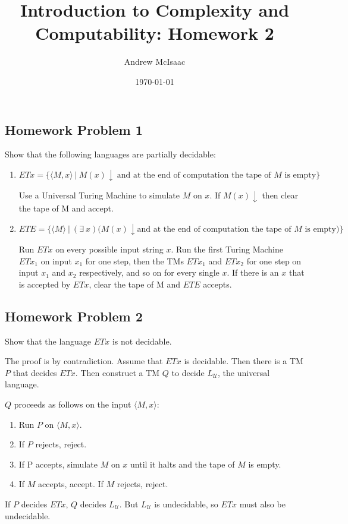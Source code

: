 \documentclass{article}
\author{Andrew McIsaac}
\title{Introduction to Complexity and Computability: Homework 2}
\date{\today}
\begin{document}
\maketitle

\subsection*{Homework Problem 1}
Show that the following languages are partially decidable:

\begin{enumerate}[label=(\alph*),leftmargin=*]
	\item $ETx = \{\langle M,x \rangle~|~M(x) \downarrow\ \textrm{and at the end
		of computation the tape of $M$ is empty}\}$

		Use a Universal Turing Machine to simulate $M$ on $x$. If $M(x)\downarrow$
		then clear the tape of M and accept.

	\item $ETE = \{\langle M \rangle~|~(\exists~x)(M(x)\downarrow \textrm{and at
		the end of computation the tape of $M$ is empty)}\}$

		Run $ETx$ on every possible input string $x$. Run the first Turing Machine $ETx_{1}$
		on input $x_{1}$ for one step, then the TMs $ETx_{1}$ and $ETx_{2}$ for
		one step on input $x_{1}$ and $x_{2}$ respectively, and so on for every
		single $x$. If there is an $x$ that is accepted by $ETx$, clear the tape
		of M and $ETE$ accepts.
	
\end{enumerate}

\subsection*{Homework Problem 2}
Show that the language $ETx$ is not decidable.

The proof is by contradiction. Assume that $ETx$ is decidable. Then there is a
TM $P$ that decides $ETx$. Then construct a TM $Q$ to decide $L_\mathcal{U}$,
the universal language.

$Q$ proceeds as follows on the input $\langle M,x \rangle$:
\begin{enumerate}
	\itemsep0em
	\item Run $P$ on $\langle M, x \rangle$.
	\item If $P$ rejects, reject.
	\item If P accepts, simulate $M$ on $x$ until it halts and the tape of $M$
		is empty.
	\item If $M$ accepts, accept. If $M$ rejects, reject.
\end{enumerate}

If $P$ decides $ETx$, $Q$ decides $L_\mathcal{U}$. But $L_\mathcal{U}$ is
undecidable, so $ETx$ must also be undecidable.
\end{document}
